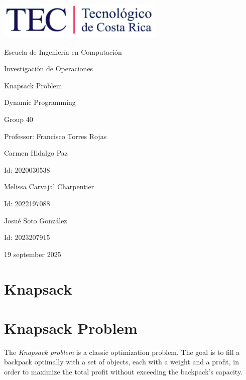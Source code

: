 \documentclass{article}
\begin{document}
\begin{titlepage}
    \centering
    \includegraphics[width=0.6\textwidth]{logo-tec.png}\par\vspace{1cm}

    {\large Escuela de Ingeniería en Computación\par}
    {\large Investigación de Operaciones\par}
    \vspace{2cm}

    {\Large Knapsack Problem\par}
    {\large Dynamic Programming\par}
    \vspace{2cm}

    {\large Group 40\par}
    {\large Professor: Francisco Torres Rojas\par}
    \vspace{3cm}

    {\large Carmen Hidalgo Paz\par}
    {\large Id: 2020030538\par}
    \vspace{1cm}
    {\large Melissa Carvajal Charpentier\par}
    {\large Id: 2022197088\par}
    \vspace{1cm}
    {\large Josué Soto González\par}
    {\large Id: 2023207915\par}
    \vspace{1cm}

    {\large 19 september 2025\par}
\end{titlepage}

\newpage


\section{Knapsack}
\section{Knapsack Problem}
The \textit{Knapsack problem} is a classic optimization problem. The goal is to fill a backpack optimally with a set of objects, each with a weight and a profit, in order to maximize the total profit without exceeding the backpack's capacity.
\end{document}
